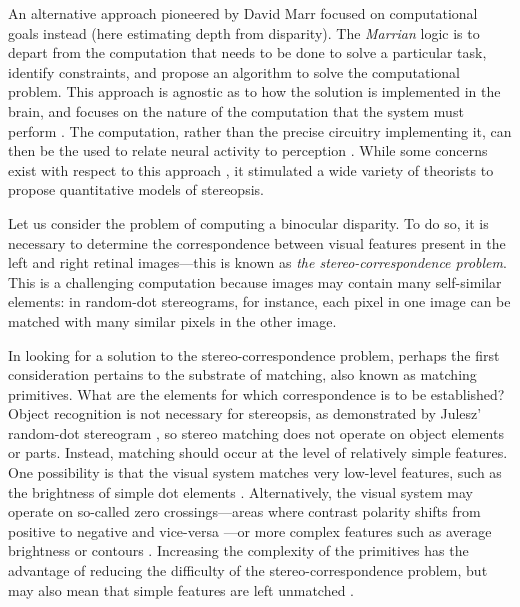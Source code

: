 An alternative approach pioneered by David Marr focused on computational goals instead (here estimating depth from disparity). The \textit{Marrian} logic is to depart from the computation that needs to be done to solve a particular task, identify constraints, and propose an algorithm to solve the computational problem. This approach is agnostic as to how the solution is implemented in the brain, and focuses on the nature of the computation that the system must perform \cite{Chomsky:1965kx,Marr:1976dq}. The computation, rather than the precise circuitry implementing it, can then be the used to relate neural activity to perception \cite{Carandini:2012ce}. While some concerns exist with respect to this approach \cite{Anderson:2015fu}, it stimulated a wide variety of theorists to propose quantitative models of stereopsis.

Let us consider the problem of computing a binocular disparity. To do so, it is necessary to determine the correspondence between visual features present in the left and right retinal images---this is known as \textit{the stereo-correspondence problem}. This is a challenging computation because images may contain many self-similar elements: in random-dot stereograms, for instance, each pixel in one image can be matched with many similar pixels in the other image. 

In looking for a solution to the stereo-correspondence problem, perhaps the first consideration pertains to the substrate of matching, also known as matching primitives. What are the elements for which correspondence is to be established? Object recognition is not necessary for stereopsis, as demonstrated by Julesz' random-dot stereogram \cite{BLTJ:BLTJ3954}, so stereo matching does not operate on object elements or parts. Instead, matching should occur at the level of relatively simple features. One possibility is that the visual system matches very low-level features, such as the brightness of simple dot elements \cite{Marr:1976dq,MAYHEW1981349}. Alternatively, the visual system may operate on so-called zero crossings---areas where contrast polarity shifts from positive to negative and vice-versa \cite{Marr:1979lh,Grimson:1981bs}---or more complex features such as average brightness or contours \cite{KAUFMAN:1964kx,KAUFMAN:1965vn,Ramachandran:1973kl,Ramachandran:1976mi}. Increasing the complexity of the primitives has the advantage of reducing the difficulty of the stereo-correspondence problem, but may also mean that simple features are left unmatched \cite{Marr:1979lh,MAYHEW1981349,Anderson:1994fk}. 

